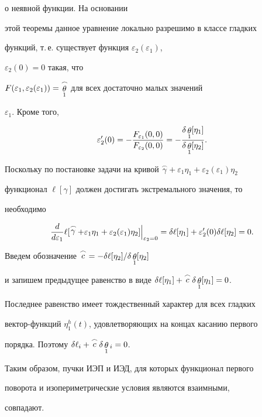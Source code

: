 \begin{pf}
о неявной функции. На основании 


этой теоремы данное уравнение локально разрешимо в классе гладких 


функций, т.\,е. существует функция $\varepsilon_2(\varepsilon_1)$, 


$\varepsilon_2(0)=0$ такая, что 


$F(\varepsilon_1,\varepsilon_2(\varepsilon_1))= 


\mymath{\theta}^\frown_1$ для всех достаточно малых значений 


$\varepsilon_1$. Кроме того, 


$$ 


\varepsilon'_2(0)=-\frac{F_{\varepsilon_1}(0,0)} 


{F_{\varepsilon_2}(0,0)}=-\frac{\delta\mymath{\theta}_1[\eta_1]} 


{\delta\mymath{\theta}_1[\eta_2]}. 


$$ 


Поскольку по постановке задачи на кривой $\overset{\frown}{\gamma}+ 


\varepsilon_1\eta_1+\varepsilon_2(\varepsilon_1)\eta_2$ 


функционал $\ell[\gamma]$ должен достигать экстремального значения, то 


необходимо 


$$ 


\frac{d}{d\varepsilon_1}\ell[\mymath{\gamma}^\frown+ 


\varepsilon_1\eta_1+\varepsilon_2(\varepsilon_1)\eta_2 


]\Big|_{\varepsilon_2=0}=\delta\ell[\eta_1]+ 


\varepsilon'_2(0)\delta\ell[\eta_2]=0. 


$$ 


 


Введем обозначение $\mymath{c}^\frown=-\delta\ell[\eta_2]/ 


\delta\mymath{\theta}_1[\eta_2]$ 


и запишем предыдущее равенство в виде $\delta\ell[\eta_1]+ 


\mymath{c}^\frown \delta\mymath{\theta}_1[\eta_1]=0$. 


Последнее равенство имеет тождественный характер для всех гладких 


вектор-функций $\eta^h_1(t)$, удовлетворяющих на концах касанию первого 


порядка. Поэтому $\delta\ell_i+\mymath{c}^\frown\delta 


\mymath{\theta}_1{}_i=0$. 


 


Таким образом, пучки ИЭП и ИЭД, для которых функционал первого 


поворота и изопериметрические условия являются взаимными, 


совпадают. 


\end{pf} 


